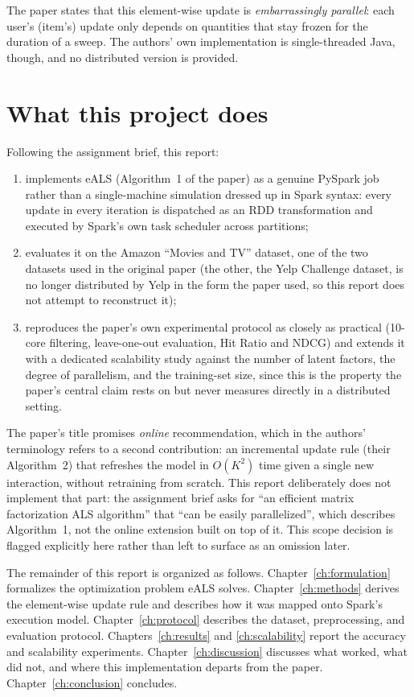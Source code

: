 \medskip
The paper states that this element-wise update is \emph{embarrassingly
parallel}: each user's (item's) update only depends on quantities that stay
frozen for the duration of a sweep. The authors' own implementation is
single-threaded Java, though, and no distributed version is provided.

\section{What this project does}

Following the assignment brief, this report:

\begin{enumerate}
  \item implements eALS (Algorithm~1 of the paper) as a genuine PySpark job
        rather than a single-machine simulation dressed up in Spark syntax:
        every update in every iteration is dispatched as an RDD
        transformation and executed by Spark's own task scheduler across
        partitions;
  \item evaluates it on the Amazon ``Movies and TV'' dataset, one of the two
        datasets used in the original paper (the other, the Yelp Challenge
        dataset, is no longer distributed by Yelp in the form the paper
        used, so this report does not attempt to reconstruct it);
  \item reproduces the paper's own experimental protocol as closely as
        practical (10-core filtering, leave-one-out evaluation, Hit Ratio
        and NDCG) and extends it with a dedicated scalability study
        against the number of latent factors, the degree of parallelism,
        and the training-set size, since this is the property the paper's
        central claim rests on but never measures directly in a
        distributed setting.
\end{enumerate}

\medskip
The paper's title promises \emph{online} recommendation, which in the
authors' terminology refers to a second contribution: an incremental
update rule (their Algorithm~2) that refreshes the model in $O(K^2)$ time
given a single new interaction, without retraining from scratch. This
report deliberately does not implement that part: the assignment brief asks
for ``an efficient matrix factorization ALS algorithm'' that ``can be
easily parallelized'', which describes Algorithm~1, not the online
extension built on top of it. This scope decision is flagged explicitly
here rather than left to surface as an omission later.

\medskip
The remainder of this report is organized as follows. Chapter~\ref{ch:formulation}
formalizes the optimization problem eALS solves. Chapter~\ref{ch:methods}
derives the element-wise update rule and describes how it was mapped onto
Spark's execution model. Chapter~\ref{ch:protocol} describes the dataset,
preprocessing, and evaluation protocol. Chapters~\ref{ch:results} and
\ref{ch:scalability} report the accuracy and scalability experiments.
Chapter~\ref{ch:discussion} discusses what worked, what did not, and where
this implementation departs from the paper. Chapter~\ref{ch:conclusion}
concludes.
